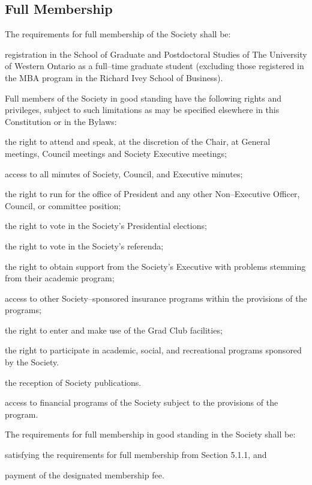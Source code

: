 \subsection{Full Membership}
	\begin{longenum}[label*=\thesubsection.\arabic*., align=left]
 \item The requirements for full membership of the Society shall be: 
     	\begin{longenum}[label*=\arabic*., align=left]
    	\item registration in the School of Graduate and Postdoctoral Studies of The University of Western Ontario as a full--time graduate student (excluding those registered in the MBA program in the Richard Ivey School of Business).
   	\end{longenum}
 \item  Full members of the Society in good standing have the following rights and privileges, subject to such limitations as may be specified elsewhere in this Constitution or in the Bylaws:
\begin{longenum}[label*=\arabic*., align=left]
  \item the right to attend and speak, at the discretion of the Chair, at General meetings, Council meetings and Society Executive meetings;
  \item access to all minutes of Society, Council, and Executive minutes;
  \item the right to run for the office of President and any other Non--Executive Officer, Council, or committee position;
  \item the right to vote in the Society's Presidential elections;
  \item the right to vote in the Society's referenda; 
  \item the right to obtain support from the Society's Executive with problems stemming from their academic program; 
  \item access to other Society--sponsored insurance programs within the provisions of the programs; 
  \item the right to enter and make use of the Grad Club facilities;
  \item the right to participate in academic, social, and recreational programs sponsored by the Society. 
  \item the reception of Society publications.
   \item access to financial programs of the Society subject to the provisions of the program.
	\end{longenum}
  \item The requirements for full membership in good standing in the Society shall be: 
  	\begin{longenum}[label*=\arabic*., align=left]
  	\item satisfying the requirements for full membership from Section 5.1.1, and 
    \item payment of the designated membership fee.  
  	\end{longenum}
 
\end{longenum}


